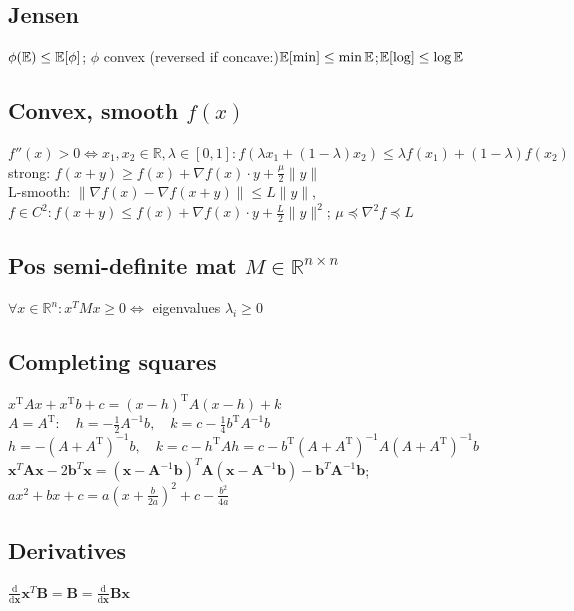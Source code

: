 \subsection*{Jensen}
$\phi(\mathbb{E})\leq \mathbb{E}[\phi]$; $\phi$ convex (reversed if concave:)$\mathbb{E}[\min]\leq \min\mathbb{E}$;$\mathbb{E}[\log]\leq\log\mathbb{E}$
\subsection*{Convex, smooth $f(x)$}
$f''(x) > 0 \Leftrightarrow x_1,x_2 \in \mathbb{R}, \lambda \in [0,1]:
f(\lambda x_1 + (1-\lambda) x_2) \leq \lambda f(x_1) + (1-\lambda) f(x_2)$\\
strong: 
$f(x+y)\geq f(x)+\nabla f(x)\cdot y+\frac{\mu}{2}\| y\|$\\
L-smooth: $\| \nabla f(x)-\nabla f(x+y)\|\leq L\|y\|$, $f\in C^2: f(x+y)\leq f(x)+\nabla f(x)\cdot y+\frac{L}{2}\| y\|^2$;
$\mu \preceq \nabla^2f \preceq L$


\subsection*{Pos semi-definite mat $M \in \mathbb{R}^{n\times n}$}
$\forall x \in \mathbb{R}^n: x^TMx \geq 0 \Leftrightarrow$ eigenvalues $\lambda_i\geq 0$
\subsection*{Completing squares}
$x^{\mathrm {T} }Ax+x^{\mathrm {T} }b+c=(x-h)^{\mathrm {T} }A(x-h)+k$ \\
$A=A^{\mathrm {T} }:\quad h=-{\frac {1}{2}}A^{-1}b,\quad k=c-{\frac {1}{4}}b^{\mathrm {T} }A^{-1}b$\\
$h=-(A+A^{\mathrm {T} })^{-1}b,\quad k=c-h^{\mathrm {T} }Ah=c-b^{\mathrm {T} }(A+A^{\mathrm {T} })^{-1}A(A+A^{\mathrm {T} })^{-1}b$\\
$\mathbf{x}^T\mathbf{A}\mathbf{x}-2\mathbf{b}^T\mathbf{x} = (\mathbf{x}-\mathbf{A}^{-1}\mathbf{b})^T\mathbf{A}(\mathbf{x}-\mathbf{A}^{-1}\mathbf{b})-\mathbf{b}^T\mathbf{A}^{-1}\mathbf{b}$;\\
$ax^{2}+bx+c=a(x+\frac{b}{2a})^{2}+c-\frac{b^2}{4a}$

\subsection*{Derivatives}

$\frac{\text{d}}{\text{d}\mathbf x}\mathbf x^T\mathbf B=\mathbf B = \frac{\text{d}}{\text{d}\mathbf x}\mathbf B\mathbf x$

